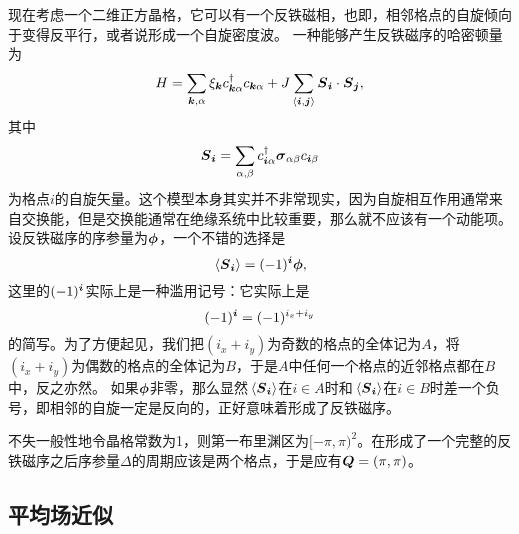 现在考虑一个二维正方晶格，它可以有一个反铁磁相，也即，相邻格点的自旋倾向于变得反平行，或者说形成一个自旋密度波。
一种能够产生反铁磁序的哈密顿量为
\begin{equation}
    {H} = \sum_{\vb*{k}, \alpha} \xi_{\vb*{k}} {c}_{\vb*{k} \alpha}^\dagger {c}_{\vb*{k} \alpha} + J \sum_{\langle \vb*{i}, \vb*{j} \rangle} {\vb*{S}}_{\vb*{i}} \cdot {\vb*{S}}_{\vb*{j}},
    \label{eq:2dim-square-spin}
\end{equation}
其中
\begin{equation}
    {\vb*{S}}_{\vb*{i}} = \sum_{\alpha, \beta} {c}^\dagger_{\vb*{i} \alpha} \vb*{\sigma}_{\alpha \beta} {c}_{\vb*{i} \beta}
    \label{eq:spin-wave-order-parameter}
\end{equation}
为格点$i$的自旋矢量。这个模型本身其实并不非常现实，因为自旋相互作用通常来自交换能，但是交换能通常在绝缘系统中比较重要，那么就不应该有一个动能项。
设反铁磁序的序参量为$\vb*{\phi}$，一个不错的选择是
\begin{equation}
    \expval*{{\vb*{S}}_{\vb*{i}}} = (-1)^{\vb*{i}} \vb*{\phi},
\end{equation}
这里的$(-1)^{\vb*{i}}$实际上是一种滥用记号：它实际上是
\[
    (-1)^{\vb*{i}} = (-1)^{i_x + i_y}
\]
的简写。为了方便起见，我们把$(i_x + i_y)$为奇数的格点的全体记为$A$，将$(i_x + i_y)$为偶数的格点的全体记为$B$，于是$A$中任何一个格点的近邻格点都在$B$中，反之亦然。
如果$\vb*{\phi}$非零，那么显然$\expval*{{\vb*{S}}_{\vb*{i}}}$在$i \in A$时和$\expval*{{\vb*{S}}_{\vb*{i}}}$在$i \in B$时差一个负号，即相邻的自旋一定是反向的，正好意味着形成了反铁磁序。

不失一般性地令晶格常数为1，则第一布里渊区为$[-\pi, \pi)^2$。在形成了一个完整的反铁磁序之后序参量$\Delta$的周期应该是两个格点，于是应有$\vb*{Q}=(\pi, \pi)$。

\subsection{平均场近似}

